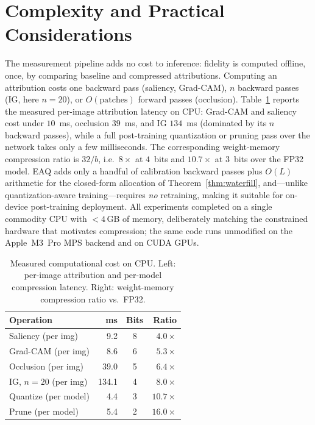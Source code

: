 \section{Complexity and Practical Considerations}
\label{sec:complexity}
The measurement pipeline adds no cost to inference: fidelity is computed offline,
once, by comparing baseline and compressed attributions. Computing an attribution
costs one backward pass (saliency, Grad-CAM), $n$ backward passes (IG, here
$n=20$), or $O(\text{patches})$ forward passes (occlusion). Table~\ref{tab:cost}
reports the measured per-image attribution latency on CPU: Grad-CAM and saliency
cost under $10$~ms, occlusion $39$~ms, and IG $134$~ms (dominated by its $n$
backward passes), while a full post-training quantization or pruning pass over
the network takes only a few milliseconds. The corresponding weight-memory
compression ratio is $32/b$, i.e.\ $8\times$ at $4$~bits and $10.7\times$ at
$3$~bits over the FP32 model. EAQ adds only a handful of calibration backward
passes plus $O(L)$ arithmetic for the closed-form allocation of
Theorem~\ref{thm:waterfill}, and---unlike quantization-aware training---requires
\emph{no} retraining, making it suitable for on-device post-training deployment.
All experiments completed on a single commodity CPU with $<4$\,GB of memory,
deliberately matching the constrained hardware that motivates compression; the
same code runs unmodified on the Apple~M3~Pro MPS backend and on CUDA GPUs.

\begin{table}[!t]
\caption{Measured computational cost on CPU. Left: per-image attribution and
per-model compression latency. Right: weight-memory compression ratio vs.\ FP32.}
\label{tab:cost}
\centering
\begin{tabular}{l r @{\hskip 1.2em} c r}
\hline
\textbf{Operation} & \textbf{ms} & \textbf{Bits} & \textbf{Ratio}\\
\hline
Saliency (per img)   & 9.2   & 8 & $4.0\times$\\
Grad-CAM (per img)   & 8.6   & 6 & $5.3\times$\\
Occlusion (per img)  & 39.0  & 5 & $6.4\times$\\
IG, $n{=}20$ (per img) & 134.1 & 4 & $8.0\times$\\
Quantize (per model) & 4.4   & 3 & $10.7\times$\\
Prune (per model)    & 5.4   & 2 & $16.0\times$\\
\hline
\end{tabular}
\end{table}

